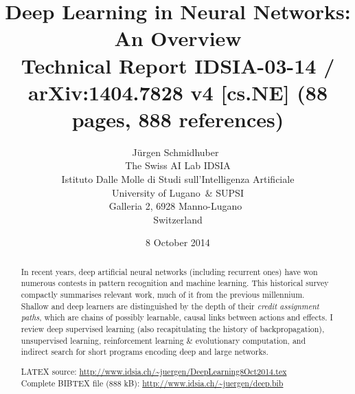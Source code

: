 \documentclass[letterpaper]{article}
\begin{document}
\begin{CJK*}{UTF8}{gbsn}

\title{Deep Learning in  Neural Networks: An Overview  \\
{\small Technical Report IDSIA-03-14 / arXiv:1404.7828 v4 [cs.NE] (88 pages, 888 references)}}

\date{8 October 2014}
\author{J\"{u}rgen Schmidhuber~\\
The Swiss AI Lab IDSIA \\
Istituto Dalle Molle di Studi sull'Intelligenza  Artificiale\\
University of Lugano~\& SUPSI \\
Galleria 2, 6928 Manno-Lugano~\\
Switzerland}
\maketitle


\begin{abstract}
In recent years, deep artificial neural networks (including recurrent ones) have won numerous contests in pattern recognition and machine learning.
This historical survey compactly summarises relevant work, much of it from the previous millennium. Shallow and deep learners are distinguished by the depth of their {\em credit assignment paths}, which are chains of possibly learnable, causal links between 
actions and effects. I review deep supervised learning (also recapitulating the history of backpropagation), unsupervised learning, reinforcement learning \& evolutionary computation, and indirect search for short programs encoding deep and large networks.

\vspace{7mm}
\noindent
LATEX source: \url{http://www.idsia.ch/~juergen/DeepLearning8Oct2014.tex} \\
Complete BIBTEX file (888 kB): \url{http://www.idsia.ch/~juergen/deep.bib}

\end{abstract}




\end{CJK*}
\end{document}
